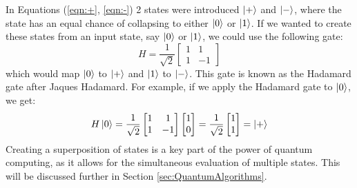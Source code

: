 \documentclass[reqno]{amsart}
\numberwithin{equation}{section}
\numberwithin{figure}{section}
\begin{document}
\begin{justify}
In Equations (\ref{eqn:+}, \ref{eqn:-}) 2 states were introduced $\ket{+}$ and $\ket{-}$, where the state has an equal chance of collapsing to either $\ket{0}$ or $\ket{1}$. If we wanted to create these states from an input state, say $\ket{0}$ or $\ket{1}$, we could use the following gate:
    \begin{equation}
        H = \frac{1}{\sqrt{2}}\begin{bmatrix}
                                1 & 1 \\
                                1 & -1
                            \end{bmatrix}
    \end{equation}
    which would map $\ket{0}$ to $\ket{+}$ and $\ket{1}$ to $\ket{-}$. This gate is known as the Hadamard gate after Jaques Hadamard. \cite{Hadamard1893} For example, if we apply the Hadamard gate to $\ket{0}$, we get:
    \begin{equation}
        H\ket{0} = \frac{1}{\sqrt{2}}\begin{bmatrix}
                                        1 & 1 \\
                                        1 & -1
                                    \end{bmatrix}\begin{bmatrix}
                                                    1 \\
                                                    0
                                                \end{bmatrix} = \frac{1}{\sqrt{2}}\begin{bmatrix}
                                                                                    1 \\
                                                                                    1
                                                                                \end{bmatrix} = \ket{+}
    \end{equation}
Creating a superposition of states is a key part of the power of quantum computing, as it allows for the simultaneous evaluation of multiple states. This will be discussed further in Section \ref{sec:QuantumAlgorithms}. \\


\end{justify}
\end{document}
